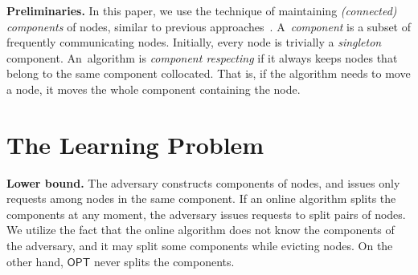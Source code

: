\documentclass[manuscript,screen=true, review, anonymous]{acmart}
\newcommand{\OPT}{\textsf{OPT}\xspace}
\begin{document}

\noindent \textbf{Preliminaries.}
In this paper, we use the technique of maintaining \emph{(connected) components} of nodes, similar to previous approaches~\cite{repartition-disc}. A~\emph{component} is a subset of frequently communicating nodes.
Initially,
every node is trivially a \emph{singleton} component.
An~algorithm is \emph{component respecting}
if it always keeps nodes that  belong to the same component collocated.
That is,
if the algorithm needs to move a node,
it moves the whole component containing the node.


\section{The Learning Problem} %
\label{sec:lowerbound}


\noindent \textbf{Lower bound.}
The adversary constructs components of nodes, and issues only requests among nodes in the same component.
If an online algorithm splits the components at any moment, the adversary issues requests to split pairs of nodes.
We utilize the fact that the online algorithm does not know the components of the adversary, and it may split some components while evicting nodes.
On the other hand, $\OPT$ never splits the components.
\end{document}
